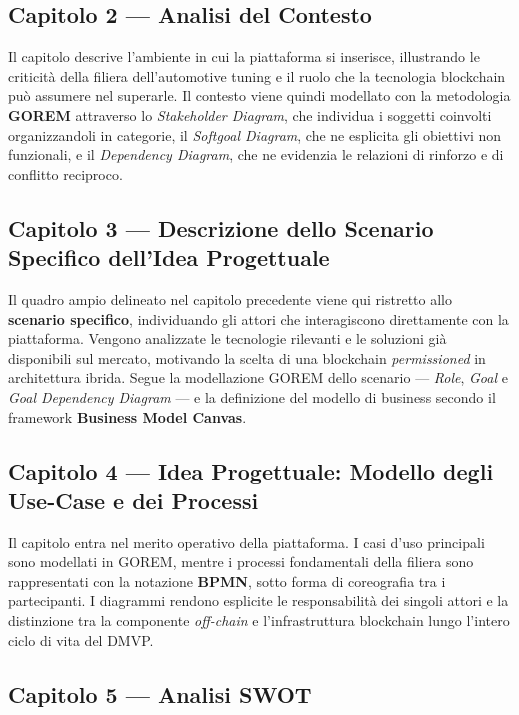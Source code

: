 \subsection*{Capitolo 2 --- Analisi del Contesto}

Il capitolo descrive l'ambiente in cui la piattaforma si inserisce, illustrando le criticit\`a della filiera dell'automotive tuning e il ruolo che la tecnologia blockchain pu\`o assumere nel superarle. Il contesto viene quindi modellato con la metodologia \textbf{GOREM} attraverso lo \textit{Stakeholder Diagram}, che individua i soggetti coinvolti organizzandoli in categorie, il \textit{Softgoal Diagram}, che ne esplicita gli obiettivi non funzionali, e il \textit{Dependency Diagram}, che ne evidenzia le relazioni di rinforzo e di conflitto reciproco.

\subsection*{Capitolo 3 --- Descrizione dello Scenario Specifico dell'Idea Progettuale}

Il quadro ampio delineato nel capitolo precedente viene qui ristretto allo \textbf{scenario specifico}, individuando gli attori che interagiscono direttamente con la piattaforma. Vengono analizzate le tecnologie rilevanti e le soluzioni gi\`a disponibili sul mercato, motivando la scelta di una blockchain \textit{permissioned} in architettura ibrida. Segue la modellazione GOREM dello scenario --- \textit{Role}, \textit{Goal} e \textit{Goal Dependency Diagram} --- e la definizione del modello di business secondo il framework \textbf{Business Model Canvas}.

\subsection*{Capitolo 4 --- Idea Progettuale: Modello degli Use-Case e dei Processi}

Il capitolo entra nel merito operativo della piattaforma. I casi d'uso principali sono modellati in GOREM, mentre i processi fondamentali della filiera sono rappresentati con la notazione \textbf{BPMN}, sotto forma di coreografia tra i partecipanti. I diagrammi rendono esplicite le responsabilit\`a dei singoli attori e la distinzione tra la componente \textit{off-chain} e l'infrastruttura blockchain lungo l'intero ciclo di vita del DMVP.

\subsection*{Capitolo 5 --- Analisi SWOT}

